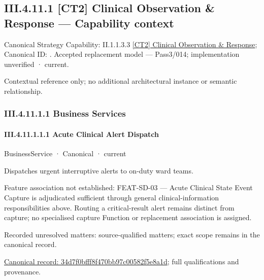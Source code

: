 \subsection*{III.4.11.1 [CT2] Clinical Observation \& Response — Capability context}
\label{navigation:III.4.11.1}

{\small Canonical Strategy Capability: II.1.1.3.3 \hyperref[element:b6794d4b6ac84b9d82613c41ad4650a2]{[CT2] Clinical Observation \& Response}; Canonical ID: \texttt{}. Accepted replacement model — Pass3/014; implementation unverified · current.}\par
Contextual reference only; no additional architectural instance or semantic relationship.\par
\subsubsection*{III.4.11.1.1 Business Services}
\label{navigation:III.4.11.1.1}

\paragraph*{III.4.11.1.1.1 Acute Clinical Alert Dispatch}
\label{navigation:III.4.11.1.1.1}

\label{element:34d7f0bfff8f470bb97c00582f5e8a1d}
{\small BusinessService · Canonical · current}\par

Dispatches urgent interruptive alerts to on-duty ward teams.



Feature association not established: FEAT-SD-03 — Acute Clinical State Event Capture is adjudicated sufficient through general clinical-information responsibilities above. Routing a critical-result alert remains distinct from capture; no specialised capture Function or replacement association is assigned.


{\small Recorded unresolved matters: source-qualified matters; exact scope remains in the canonical record.}\par
{\footnotesize \href{../../../../../../../continuum/business/business-service/34d7f0bfff8f470bb97c00582f5e8a1d.md}{Canonical record: 34d7f0bfff8f470bb97c00582f5e8a1d}; full qualifications and provenance.}\par
